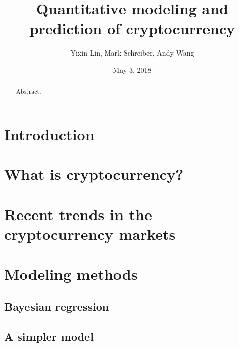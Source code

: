 \documentclass{article}
\title{Quantitative modeling and prediction of cryptocurrency}
\author{Yixin Lin, Mark Schreiber, Andy Wang}
\date{May 3, 2018}
\begin{document}
\maketitle

\begin{abstract}
    Abstract.
\end{abstract}

\tableofcontents

\newpage

\section{Introduction}

\section{What is cryptocurrency?}

\section{Recent trends in the cryptocurrency markets}

\section{Modeling methods}

\subsection{Bayesian regression}

\cite{shah2014bayesian}

\subsection{A simpler model}

\cite{amjad2017trading}

\newpage

\nocite{*}
{}

\end{document}
